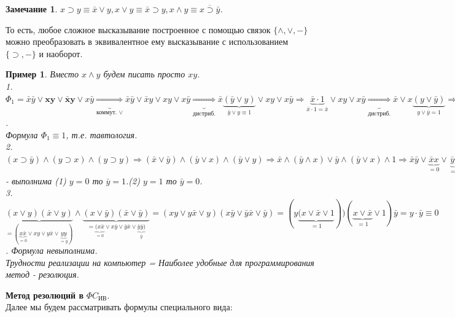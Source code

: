 \documentclass{article}
\newtheorem{example}{Пример}
\newtheorem{Remark}{Замечание}
\numberwithin{example}{section}
\numberwithin{question}{section}
\numberwithin{Remark}{section}
\numberwithin{theorem}{section}
\numberwithin{definition}{section}
\numberwithin{proposition}{section}
\begin{document}
	\begin{Remark}
		$x\supset y \equiv \bar{x}\lor y,$\quad$x\lor y \equiv \bar{x}\supset y,$\quad$x\land y \equiv \overline{x\supset \bar{y}}$.
	\end{Remark}
	То есть, любое сложное высказывание построенное с помощью связок $\{\land ,\lor ,-\}$ можно преобразовать в эквивалентное ему высказывание с использованием $\{\supset ,-\}$ и наоборот.
	\begin{example}
		Вместо $x\land y$ будем писать просто $xy$.\\
		1. $\Phi_1 = \bar{x}\bar{y}\lor \bm{xy \lor \bar{x}y}\lor x\bar{y}\underbrace{\Rightarrow}_{\text{коммут. }\lor} \bar{x}\bar{y}\lor \bar{x}y\lor xy\lor x\bar{y}\underbrace{\Rightarrow}_{\text{диcтриб.}}\bar{x}\underbrace{(\bar{y}\lor y)}_{\bar{y}\lor y\equiv 1}\lor xy \lor x\bar{y}\Rightarrow \underbrace{\bar{x}\cdot 1}_{\bar{x}\cdot 1=\bar{x}}\lor xy\lor x\bar{y}\underbrace{\Rightarrow}_{\text{диcтриб.}}\bar{x}\lor x\underbrace{(y\lor \bar{y})}_{y\lor \bar{y}=1}\Rightarrow \bar{x}\lor x\cdot 1=\bar{x}\lor x\equiv 1$.\\
		Формула $\Phi_1\equiv 1$, т.е. тавтология.\\
		2.$(x\supset \bar{y})\land (y\supset x)\land (y\supset y)\Rightarrow (\bar{x}\lor \bar{y})\land (\bar{y}\lor x)\land (\bar{y}\lor y)\Rightarrow \bar{x}\land (\bar{y}\land x)\lor \bar{y}\land (\bar{y}\lor x)\land 1\Rightarrow \bar{x}\bar{y}\lor \underbrace{\bar{x}x}_{=0}\lor \underbrace{\bar{y}\bar{y}}_{=0}\lor \bar{y}x\Rightarrow \bar{x}\bar{y}\lor \bar{y}x \Rightarrow \bar{y}\underbrace{(x\lor \bar{x})}_{=1}\Rightarrow \bar{y}$ - выполнима (1) $y=0$ то $\bar{y}=1$.(2) $y=1$ то $\bar{y}=0$.\\
		3. $\underbrace{(x\lor y)(\bar{x}\lor y)}_{=(\underbrace{x\bar{x}}_{=0}\lor xy\lor y\bar{x}\lor \underbrace{yy}_{=y})}\wedge\underbrace{(x\lor \bar{y})(\bar{x}\lor \bar{y})}_{=\underbrace{(x\bar{x}}_{=0}\lor x\bar{y}\lor \bar{y}\bar{x}\lor \underbrace{\bar{y}\bar{y})}_{\bar{y}}}=(xy\lor y\bar{x}\lor y)(x\bar{y}\lor \bar{y}\bar{x}\lor \bar{y})=(y\underbrace{(x\lor \bar{x}\lor 1}_{=1}))(\underbrace{x\lor \bar{x}}_{=1}\lor 1)\bar{y}=y\cdot \bar{y}\equiv 0$. Формула невыполнима.\\
		Трудности реализации на компьютер = Наиболее удобные для программирования метод - резолюция.\\
	\end{example}
\textbf{Метод резолюций в} $\Phi C_\text{ИВ}$.\\
Далее мы будем рассматривать формулы специального вида:\\
\end{document}
